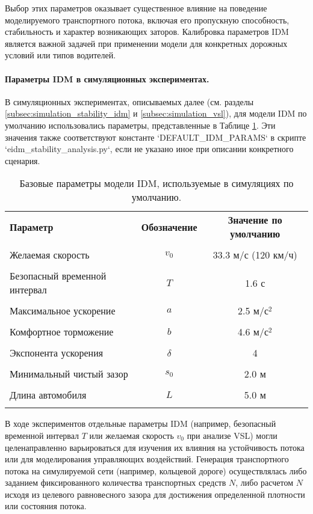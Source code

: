 \documentclass[12pt, a4paper]{article}
\begin{document}
Выбор этих параметров оказывает существенное влияние на поведение моделируемого транспортного потока, включая его пропускную способность, стабильность и характер возникающих заторов. Калибровка параметров IDM является важной задачей при применении модели для конкретных дорожных условий или типов водителей.

\paragraph{Параметры IDM в симуляционных экспериментах.}
В симуляционных экспериментах, описываемых далее (см. разделы \ref{subsec:simulation_stability_idm} и \ref{subsec:simulation_vsl}), для модели IDM по умолчанию использовались параметры, представленные в Таблице \ref{tab:idm_default_params_sim}. Эти значения также соответствуют константе `DEFAULT_IDM_PARAMS` в скрипте `eidm_stability_analysis.py`, если не указано иное при описании конкретного сценария.

\begin{table}[h!]
\centering
\caption{Базовые параметры модели IDM, используемые в симуляциях по умолчанию.}
\label{tab:idm_default_params_sim}
\begin{tabular}{|l|c|c|}
\hline
\textbf{Параметр} & \textbf{Обозначение} & \textbf{Значение по умолчанию} \\\\
\hline
Желаемая скорость & $v_0$ & 33.3 м/с (120 км/ч) \\\\
Безопасный временной интервал & $T$ & 1.6 с \\\\
Максимальное ускорение & $a$ & 2.5 м/с$^2$ \\\\
Комфортное торможение & $b$ & 4.6 м/с$^2$ \\\\
Экспонента ускорения & $\delta$ & 4 \\\\
Минимальный чистый зазор & $s_0$ & 2.0 м \\\\
Длина автомобиля & $L$ & 5.0 м \\\\
\hline
\end{tabular}
\end{table}

В ходе экспериментов отдельные параметры IDM (например, безопасный временной интервал $T$ или желаемая скорость $v_0$ при анализе VSL) могли целенаправленно варьироваться для изучения их влияния на устойчивость потока или для моделирования управляющих воздействий. Генерация транспортного потока на симулируемой сети (например, кольцевой дороге) осуществлялась либо заданием фиксированного количества транспортных средств $N$, либо расчетом $N$ исходя из целевого равновесного зазора для достижения определенной плотности или состояния потока.
\end{document}
